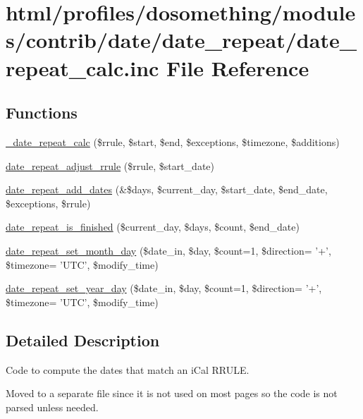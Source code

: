 \hypertarget{date__repeat__calc_8inc}{
\section{html/profiles/dosomething/modules/contrib/date/date\_\-repeat/date\_\-repeat\_\-calc.inc File Reference}
\label{date__repeat__calc_8inc}
}
\subsection*{Functions}
\begin{DoxyCompactItemize}
\item 
\hyperlink{date__repeat__calc_8inc_ad796c923ad9e24f33935e46db723e0d5}{\_\-date\_\-repeat\_\-calc} (\$rrule, \$start, \$end, \$exceptions, \$timezone, \$additions)
\item 
\hyperlink{date__repeat__calc_8inc_ac7db442bbe826375c43885aea6f2ab97}{date\_\-repeat\_\-adjust\_\-rrule} (\$rrule, \$start\_\-date)
\item 
\hyperlink{date__repeat__calc_8inc_a046e6888825942f799c920fd836ac093}{date\_\-repeat\_\-add\_\-dates} (\&\$days, \$current\_\-day, \$start\_\-date, \$end\_\-date, \$exceptions, \$rrule)
\item 
\hyperlink{date__repeat__calc_8inc_ab88ff1562600418b74f2063c257a33b4}{date\_\-repeat\_\-is\_\-finished} (\$current\_\-day, \$days, \$count, \$end\_\-date)
\item 
\hyperlink{date__repeat__calc_8inc_a77b30690f7f9b9caab51f3dc4c652aa9}{date\_\-repeat\_\-set\_\-month\_\-day} (\$date\_\-in, \$day, \$count=1, \$direction= '+', \$timezone= 'UTC', \$modify\_\-time)
\item 
\hyperlink{date__repeat__calc_8inc_a2feae22de131cda2a56cacbacd5c5dc0}{date\_\-repeat\_\-set\_\-year\_\-day} (\$date\_\-in, \$day, \$count=1, \$direction= '+', \$timezone= 'UTC', \$modify\_\-time)
\end{DoxyCompactItemize}


\subsection{Detailed Description}
Code to compute the dates that match an iCal RRULE.

Moved to a separate file since it is not used on most pages so the code is not parsed unless needed.


